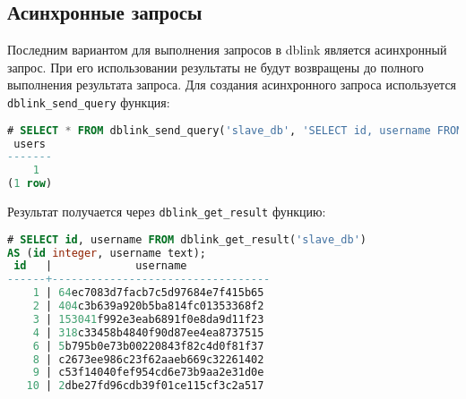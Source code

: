 \subsection{Асинхронные запросы}

Последним вариантом для выполнения запросов в dblink является асинхронный запрос. При его использовании результаты не будут возвращены до полного выполнения результата запроса. Для создания асинхронного запроса используется \lstinline!dblink_send_query! функция:

\begin{lstlisting}[language=SQL,label=lst:dblink7,caption=dblink\_send\_query]
# SELECT * FROM dblink_send_query('slave_db', 'SELECT id, username FROM users') AS users;
 users
-------
    1
(1 row)
\end{lstlisting}

Результат получается через \lstinline!dblink_get_result! функцию:

\begin{lstlisting}[language=SQL,label=lst:dblink8,caption=dblink\_get\_result]
# SELECT id, username FROM dblink_get_result('slave_db')
AS (id integer, username text);
 id   |             username
------+----------------------------------
    1 | 64ec7083d7facb7c5d97684e7f415b65
    2 | 404c3b639a920b5ba814fc01353368f2
    3 | 153041f992e3eab6891f0e8da9d11f23
    4 | 318c33458b4840f90d87ee4ea8737515
    6 | 5b795b0e73b00220843f82c4d0f81f37
    8 | c2673ee986c23f62aaeb669c32261402
    9 | c53f14040fef954cd6e73b9aa2e31d0e
   10 | 2dbe27fd96cdb39f01ce115cf3c2a517
\end{lstlisting}
